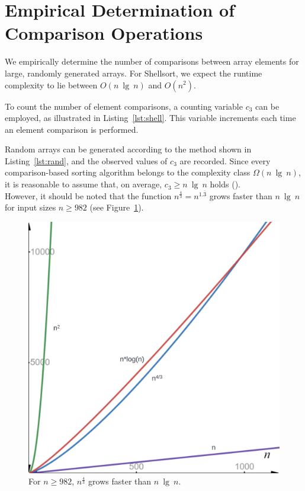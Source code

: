 \section{Empirical Determination of Comparison Operations}

We empirically determine the number of comparisons between array elements for large, randomly generated arrays.
For Shellsort, we expect the runtime complexity to lie between $O(n\ \lg\ n)$ and $O(n^2)$.

To count the number of element comparisons, a counting variable $c_3$ can be employed, as illustrated in Listing~\ref{lst:shell}.
This variable increments each time an element comparison is performed.

Random arrays can be generated according to the method shown in Listing~\ref{lst:rand}, and the observed values of $c_3$ are recorded.
Since every comparison-based sorting algorithm belongs to the complexity class $\Omega(n\ \lg\ n)$, it is reasonable to assume that, on average, $c_3 \geq n\ \lg\ n$ holds (\cite[154]{OW17b}).\\

However, it should be noted that the function $n^{\frac{4}{3}} = n^{1.\overline{3}}$ grows faster than $n\ \lg\ n$ for input sizes $n \geq 982$ (see Figure~\ref{fig:lognplot}).

\begin{figure}[!h]
    \centering
    \includegraphics[width=0.8\columnwidth]{img/lognplot}
    \caption{For $n \geq 982$, $n^{\frac{4}{3}}$ grows faster than $n\ \lg\ n$.}
    \label{fig:lognplot}
\end{figure}



